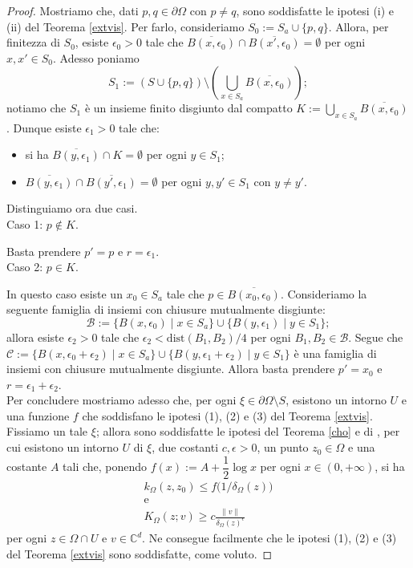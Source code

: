 \begin{proof}
    Mostriamo che, dati $p,q\in\partial\Omega$ con $p\not=q$, sono soddisfatte le ipotesi (i) e (ii) del Teorema \ref{extvis}. Per farlo, consideriamo $S_0:=S_a\cup\{p,q\}$. Allora, per finitezza di $S_0$, esiste $\epsilon_0>0$ tale che $\overline{B(x,\epsilon_0)}\cap\overline{B(x',\epsilon_0)}=\emptyset$ per ogni $x,x'\in S_0$. Adesso poniamo
    $$S_1:=(S\cup\{p,q\})\setminus\left(\bigcup_{x\in S_a}\overline{B(x,\epsilon_0)}\right);$$
    notiamo che $S_1$ è un insieme finito disgiunto dal compatto $K:=\displaystyle\bigcup_{x\in S_a}\overline{B(x,\epsilon_0)}$. Dunque esiste $\epsilon_1>0$ tale che:
    \begin{itemize}
        \item si ha $\overline{B(y,\epsilon_1)}\cap K=\emptyset$ per ogni $y\in S_1$;
        \item $\overline{B(y,\epsilon_1)}\cap\overline{B(y',\epsilon_1)}=\emptyset$ per ogni $y,y'\in S_1$ con $y\not=y'$.
    \end{itemize}
    
    Distinguiamo ora due casi. \\

    Caso 1: $p\not\in K$.

    Basta prendere $p'=p$ e $r=\epsilon_1$. \\

    Caso 2: $p\in K$.

    In questo caso esiste un $x_0\in S_a$ tale che $p\in\overline{B(x_0,\epsilon_0)}$. Consideriamo la seguente famiglia di insiemi con chiusure mutualmente disgiunte:
    $$\mathcal{B}:=\{B(x,\epsilon_0)\mid x\in S_a\}\cup\{B(y,\epsilon_1)\mid y\in S_1\};$$
    allora esiste $\epsilon_2>0$ tale che $\epsilon_2<\text{dist}(B_1,B_2)/4$ per ogni $B_1,B_2\in\mathcal{B}$. Segue che $\mathcal{C}:=\{B(x,\epsilon_0+\epsilon_2)\mid x\in S_a\}\cup\{B(y,\epsilon_1+\epsilon_2)\mid y\in S_1\}$ è una famiglia di insiemi con chiusure mutualmente disgiunte. Allora basta prendere $p'=x_0$ e $r=\epsilon_1+\epsilon_2$. \\

    Per concludere mostriamo adesso che, per ogni $\xi\in\partial\Omega\setminus S$, esistono un intorno $U$ e una funzione $f$ che soddisfano le ipotesi (1), (2) e (3) del Teorema \ref{extvis}. Fissiamo un tale $\xi$; allora sono soddisfatte le ipotesi del Teorema \ref{cho} e di \cite[Proposition 2.5]{FR}, per cui esistono un intorno $U$ di $\xi$, due costanti $c,\epsilon>0$, un punto $z_0\in\Omega$ e una costante $A$ tali che, ponendo $f(x):=A+\dfrac{1}{2}\log{x}$ per ogni $x\in(0,+\infty)$, si ha
    \begin{gather*}
        k_\Omega(z,z_0) \le f\big(1/\delta_\Omega(z)\big)\\
        \text{e}\\
        K_\Omega(z;v) \ge c\frac{\|v\|}{\delta_\Omega(z)^{\epsilon}}
    \end{gather*}
    per ogni $z\in\Omega\cap U$ e $v\in\mathbb{C}^d$. Ne consegue facilmente che le ipotesi (1), (2) e (3) del Teorema \ref{extvis} sono soddisfatte, come voluto.
\end{proof}

